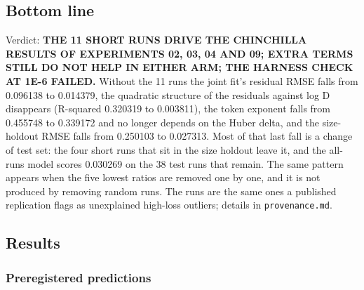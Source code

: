 
\subsection*{Bottom line}

Verdict: \textbf{THE 11 SHORT RUNS DRIVE THE CHINCHILLA RESULTS OF EXPERIMENTS 02, 03, 04 AND 09; EXTRA TERMS STILL DO NOT HELP IN EITHER ARM; THE HARNESS CHECK AT 1E-6 FAILED.} Without the 11 runs the joint fit's residual RMSE falls from 0.096138 to 0.014379, the quadratic structure of the residuals against log D disappears (R-squared 0.320319 to 0.003811), the token exponent falls from 0.455748 to 0.339172 and no longer depends on the Huber delta, and the size-holdout RMSE falls from 0.250103 to 0.027313. Most of that last fall is a change of test set: the four short runs that sit in the size holdout leave it, and the all-runs model scores 0.030269 on the 38 test runs that remain. The same pattern appears when the five lowest ratios are removed one by one, and it is not produced by removing random runs. The runs are the same ones a published replication flags as unexplained high-loss outliers; details in \texttt{provenance.md}.


\subsection*{Results}
\subsubsection*{Preregistered predictions}

